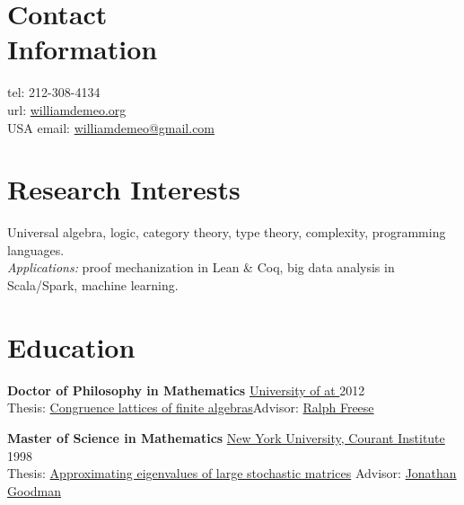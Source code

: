 \documentclass[margin,line]{resume}
\begin{document}
\begin{resume}

    \section{\mysidestyle Contact\\Information}
     \streetaddress   \hfill tel: 212-308-4134\\
     \citystatezip       \hfill url: \href{http://williamdemeo.org}{williamdemeo.org}\\
     {\small USA}             \hfill email: \href{mailto:williamdemeo@gmail.com}{williamdemeo@gmail.com}

     \vspace{-1mm}
     \section{\mysidestyle Research Interests}

     Universal algebra, logic, category theory, type theory, complexity, programming languages.\\[3pt] 
     {\it Applications:} proof mechanization in Lean \& Coq, big data analysis in Scala/Spark, machine learning.
        

    \vspace{-1mm}
    \section{\mysidestyle Education}

    \textbf{Doctor of Philosophy in Mathematics} \hfill \href{https://math.hawaii.edu/wordpress/}{University of \Hawaii at \Manoa} 2012\\    
    {\small Thesis: \href{https://arxiv.org/abs/1204.4305}{Congruence lattices of finite algebras}\hfill Advisor:  \href{http://math.hawaii.edu/~ralph/}{Ralph Freese}}

    \vspace{-2mm}
    \textbf{Master of Science in Mathematics} \hfill \href{https://cims.nyu.edu/}{New York University, Courant Institute} 1998\\
    {\small Thesis: \href{https://williamdemeo.github.io/MSThesis/}{Approximating eigenvalues of large stochastic matrices} \hfill Advisor: \href{https://www.math.nyu.edu/faculty/goodman/index.html}{Jonathan Goodman}}


\end{resume}
\end{document}
